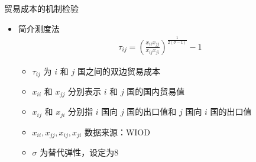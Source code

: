 \documentclass{beamer}
\begin{document}
\begin{frame}{贸易成本的机制检验}
    \begin{itemize}
        \item 简介测度法
        \begin{align*}
            \tau_{ij}=(\frac{x_{ii}x_{jj}}{x_{ij}x_{ji}})^\frac{1}{2(\sigma - 1)}-1 \tag{16}
        \end{align*}
        \begin{itemize}
            \item $\tau_{ij}$ 为 $i$ 和 $j$ 国之间的双边贸易成本
            \item $x_{ii}$ 和 $x_{jj}$ 分别表示 $i$ 和 $j$ 国的国内贸易值
            \item $x_{ij}$ 和 $x_{ji}$ 分别指 $i$ 国向 $j$ 国的出口值和 $j$ 国向 $i$ 国的出口值
            \item $x_{ii}, x_{jj}, x_{ij}, x_{ji}$ 数据来源：WIOD
            \item $\sigma$ 为替代弹性，设定为8
        \end{itemize}
    \end{itemize}
\end{frame}
\end{document}
